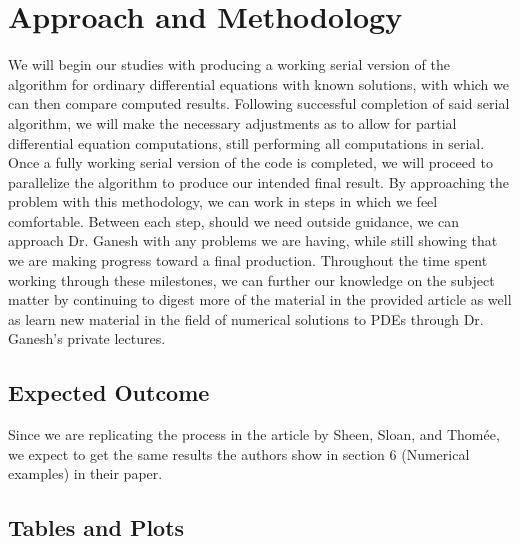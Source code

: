 \documentclass[letterpaper, 12pt]{article}
\begin{document}
	\section*{Approach and Methodology}
	\hspace{5mm} We will begin our studies with producing a working serial version of the algorithm for ordinary differential equations with known solutions, with which we can then compare computed results. Following successful completion of said serial algorithm, we will make the necessary adjustments as to allow for partial differential equation computations, still performing all computations in serial. Once a fully working serial version of the code is completed, we will proceed to parallelize the algorithm to produce our intended final result. By approaching the problem with this methodology, we can work in steps in which we feel comfortable. Between each step, should we need outside guidance, we can approach Dr. Ganesh with any problems we are having, while still showing that we are making progress toward a final production. Throughout the time spent working through these milestones, we can further our knowledge on the subject matter by continuing to digest more of the material in the provided article\cite{sheen03} as well as learn new material in the field of numerical solutions to PDEs through Dr. Ganesh's private lectures.
	
	\subsection*{Expected Outcome}
	\hspace{5mm} Since we are replicating the process in the article by Sheen, Sloan, and Thom\'{e}e, we expect to get the same results the authors show in section 6 (Numerical examples) in their paper.\cite{sheen03}
	
	\subsection*{Tables and Plots}
	
\end{document}

